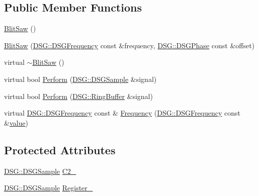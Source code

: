 \subsection*{Public Member Functions}
\begin{DoxyCompactItemize}
\item 
\hyperlink{class_d_s_g_1_1_b_l_i_t_1_1_blit_saw_a5c73a4aeb4df74da4db4896edeb15059}{Blit\+Saw} ()
\item 
\hyperlink{class_d_s_g_1_1_b_l_i_t_1_1_blit_saw_a3d7e4379c00970fa89085ed2c945a2b7}{Blit\+Saw} (\hyperlink{namespace_d_s_g_a4315a061386fa1014fda09b15d3a6973}{D\+S\+G\+::\+D\+S\+G\+Frequency} const \&frequency, \hyperlink{namespace_d_s_g_a44431ce1eb0a7300efdd207bc879e52c}{D\+S\+G\+::\+D\+S\+G\+Phase} const \&offset)
\item 
virtual \hyperlink{class_d_s_g_1_1_b_l_i_t_1_1_blit_saw_a4744c63b29aee896823f19965e11e515}{$\sim$\+Blit\+Saw} ()
\item 
virtual bool \hyperlink{class_d_s_g_1_1_b_l_i_t_1_1_blit_saw_ae24821c51b23b9fe9220a620e558af04}{Perform} (\hyperlink{namespace_d_s_g_ac39a94cd27ebcd9c1e7502d0c624894a}{D\+S\+G\+::\+D\+S\+G\+Sample} \&signal)
\item 
virtual bool \hyperlink{class_d_s_g_1_1_b_l_i_t_1_1_blit_saw_ad2edba8ed83558e76afed6ec1d5cf4d6}{Perform} (\hyperlink{class_d_s_g_1_1_ring_buffer}{D\+S\+G\+::\+Ring\+Buffer} \&signal)
\item 
virtual \hyperlink{namespace_d_s_g_a4315a061386fa1014fda09b15d3a6973}{D\+S\+G\+::\+D\+S\+G\+Frequency} const \& \hyperlink{class_d_s_g_1_1_b_l_i_t_1_1_blit_saw_a290d01796efca84b73eb61a3bc419ebb}{Frequency} (\hyperlink{namespace_d_s_g_a4315a061386fa1014fda09b15d3a6973}{D\+S\+G\+::\+D\+S\+G\+Frequency} const \&\hyperlink{class_d_s_g_1_1_b_l_i_t_1_1_blit_ac8fb9d4fb45d0697bf364bb5d6b570ce}{value})
\end{DoxyCompactItemize}
\subsection*{Protected Attributes}
\begin{DoxyCompactItemize}
\item 
\hyperlink{namespace_d_s_g_ac39a94cd27ebcd9c1e7502d0c624894a}{D\+S\+G\+::\+D\+S\+G\+Sample} \hyperlink{class_d_s_g_1_1_b_l_i_t_1_1_blit_saw_a39ff301ab1f690c070b2045d4a2c40bf}{C2\+\_\+}
\item 
\hyperlink{namespace_d_s_g_ac39a94cd27ebcd9c1e7502d0c624894a}{D\+S\+G\+::\+D\+S\+G\+Sample} \hyperlink{class_d_s_g_1_1_b_l_i_t_1_1_blit_saw_a15da9acffc369dd3c5233c05d37ee488}{Register\+\_\+}
\end{DoxyCompactItemize}
